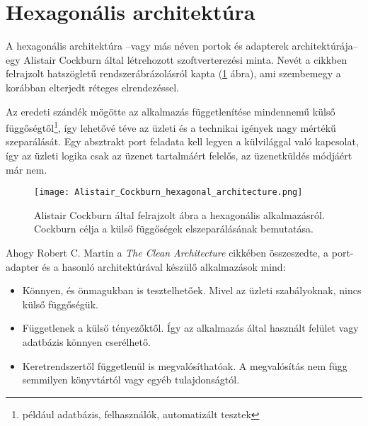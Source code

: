 \section{Hexagonális architektúra}\label{sec:hexagonalis_architektura}
A hexagonális architektúra --vagy más néven portok és adapterek architektúrája-- egy \foreignlanguage{british}{Alistair Cockburn} által létrehozott \cite{Alistair_Cockburn} szoftverterezési minta. Nevét a cikkben felrajzolt hatszögletű rendszerábrázolásról kapta (\ref{fig:Alistair_Cockburn_hexagonal_architecture} ábra), ami szembemegy a korábban elterjedt réteges elrendezéssel.

Az eredeti szándék mögötte az alkalmazás függetlenítése mindennemű külső függőségtől\footnote{például adatbázis, felhasználók, automatizált tesztek}, így lehetővé téve az üzleti és a technikai igények nagy mértékű szeparálását.
Egy absztrakt port feladata kell legyen a külvilággal való kapcsolat, így az üzleti logika csak az üzenet tartalmáért felelős, az üzenetküldés módjáért már nem.

\begin{figure}[hbt] 
	\centering
		\texttt{[image: Alistair\_Cockburn\_hexagonal\_architecture.png]}
	\caption[Hexagonális alkalmazások felépítése]{\foreignlanguage{british}{Alistair Cockburn} által \cite{Alistair_Cockburn} felrajzolt ábra a hexagonális alkalmazásról. Cockburn célja a külső függőségek elszeparálásának bemutatása.
}\label{fig:Alistair_Cockburn_hexagonal_architecture}
\end{figure}

Ahogy \foreignlanguage{british}{Robert C. Martin} a \foreignlanguage{british}{\textit{The Clean Architecture}} cikkében \cite{The_Clean_Architecture} összeszedte, a port-adapter és a hasonló architektúrával készülő alkalmazások mind:	
\begin{itemize}
	\item Könnyen, és önmagukban is tesztelhetőek. Mivel az üzleti szabályoknak, nincs külső függőségük.
	
	\item Függetlenek a külső tényezőktől. Így az alkalmazás által használt felület vagy adatbázis könnyen cserélhető.
	
	\item Keretrendszertől függetlenül is megvalósíthatóak. A megvalósítás nem függ semmilyen könyvtártól vagy egyéb tulajdonságtól.
\end{itemize}
	
	

